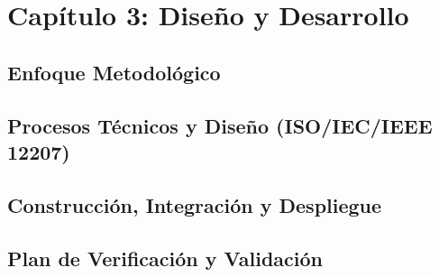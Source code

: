 \section{Capítulo 3: Diseño y Desarrollo}

\subsection{Enfoque Metodológico}


\subsection{Procesos Técnicos y Diseño (ISO/IEC/IEEE 12207)}


\subsection{Construcción, Integración y Despliegue}


\subsection{Plan de Verificación y Validación}\label{sec:verificacion_validacion}

